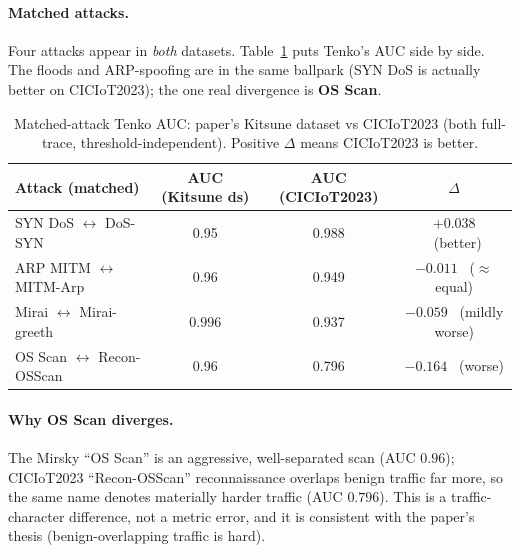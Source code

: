 \documentclass[11pt]{article}
\begin{document}
\paragraph{Matched attacks.} Four attacks appear in \emph{both} datasets. Table~\ref{tab:matched}
puts Tenko's AUC side by side. The floods and ARP-spoofing are in the same ballpark (SYN DoS is
actually better on CICIoT2023); the one real divergence is \textbf{OS Scan}.

\begin{table}[t]
\centering
\caption{Matched-attack Tenko AUC: paper's Kitsune dataset vs CICIoT2023 (both full-trace,
threshold-independent). Positive $\Delta$ means CICIoT2023 is better.}
\label{tab:matched}
\small
\begin{tabular}{lccc}
\toprule
\textbf{Attack (matched)} & \textbf{AUC (Kitsune ds)} & \textbf{AUC (CICIoT2023)} & \textbf{$\Delta$} \\
\midrule
SYN DoS $\leftrightarrow$ DoS-SYN        & 0.95  & 0.988 & $+0.038$ \ (better) \\
ARP MITM $\leftrightarrow$ MITM-Arp      & 0.96  & 0.949 & $-0.011$ \ ($\approx$ equal) \\
Mirai $\leftrightarrow$ Mirai-greeth     & 0.996 & 0.937 & $-0.059$ \ (mildly worse) \\
OS Scan $\leftrightarrow$ Recon-OSScan   & 0.96  & 0.796 & $-0.164$ \ (worse) \\
\bottomrule
\end{tabular}
\end{table}

\paragraph{Why OS Scan diverges.} The Mirsky ``OS Scan'' is an aggressive, well-separated scan
(AUC $0.96$); CICIoT2023 ``Recon-OSScan'' reconnaissance overlaps benign traffic far more, so the
same name denotes materially harder traffic (AUC $0.796$). This is a traffic-character difference,
not a metric error, and it is consistent with the paper's thesis (benign-overlapping traffic is
hard).
\end{document}
